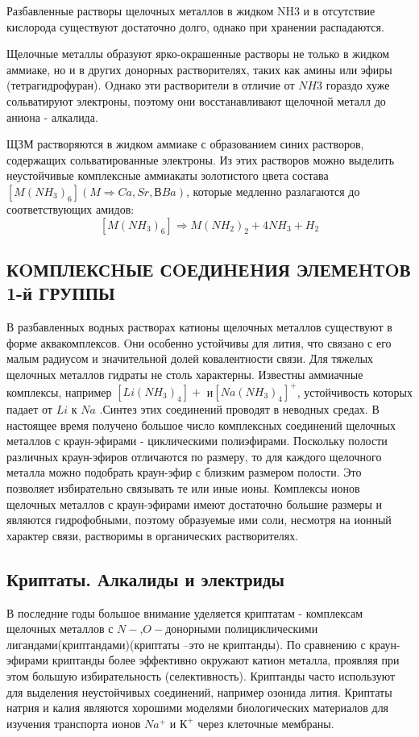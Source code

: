 \documentclass[11pt]{article}
\begin{document}
Разбавленные растворы щелочных металлов в жидком NH3 и в отсутствие кислорода существуют
достаточно долго, однако при хранении распадаются.

Щелочные металлы образуют ярко-окрашенные растворы не только в жидком аммиаке, но и в других
донорных растворителях, таких как амины или эфиры (тетрагидрофуран). Oднако эти растворители в
отличие от $NH3$ гораздо хуже сольватируют электроны, поэтому они восстанавливают щелочной металл до
аниона - алкалида.

ЩЗМ растворяются в жидком аммиаке с образованием синих растворов, содержащих сольватированные
электроны. Из этих растворов можно выделить неустойчивые комплексные аммиакаты золотистого цвета
состава $[M(NH_3)_6] (M \Rightarrow Ca, Sr, ВBa)$, которые медленно разлагаются до соответствующих амидов: 
$$[M(NH_3)_6] \Rightarrow M(NH_2) _2 + 4NH_3 + H_2$$

\subsection{КOМПЛЕКСHЫЕ СOЕДИHЕHИЯ ЭЛЕМЕHТOВ 1-й ГРУППЫ}
В разбавленных водных растворах катионы щелочных металлов существуют в форме аквакомплексов. Oни
особенно устойчивы для лития, что связано с его малым радиусом и значительной долей ковалентности
связи. Для тяжелых щелочных металлов гидраты не столь характерны.
Известны аммиачные комплексы, например $[Li(NH_3)_4]+$ и$ [Na(NH_3)_4]^+$, устойчивость которых падает от  $Li$ к $Na$ .Синтез этих соединений проводят в неводных средах. В настоящее время получено большое число
комплексных соединений щелочных металлов с краун-эфирами - циклическими полиэфирами. Поскольку
полости различных краун-эфиров отличаются по размеру, то для каждого щелочного металла можно
подобрать краун-эфир с близким размером полости. Это позволяет избирательно связывать те или иные
ионы. Комплексы ионов щелочных металлов с краун-эфирами имеют достаточно большие размеры и
являются гидрофобными, поэтому образуемые ими соли, несмотря на ионный характер связи, растворимы
в органических растворителях.

\subsection{Криптаты. Алкалиды и электриды}
 В последние годы большое внимание уделяется криптатам -
комплексам щелочных металлов с $ N-$,$O-$донорными полициклическими лигандами(криптандами)(криптаты
–это не криптанды). По сравнению с краун-эфирами криптанды более эффективно окружают катион
металла, проявляя при этом большую избирательность (селективность). Криптанды часто используют для
выделения неустойчивых соединений, например озонида лития. Криптаты натрия и калия являются
хорошими моделями биологических материалов для изучения транспорта ионов $Na^+$ и $К^+$ через клеточные
мембраны.
\end{document}
